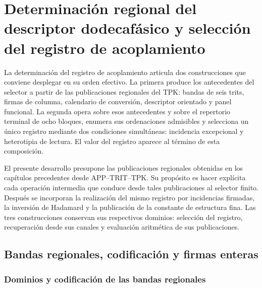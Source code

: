 \section{Determinación regional del descriptor dodecafásico y selección del registro de acoplamiento}
\label{chap:despliegue-selector-k}

La determinación del registro de acoplamiento articula dos construcciones
que conviene desplegar en su orden efectivo. La primera produce los
antecedentes del selector a partir de las publicaciones regionales del TPK:
bandas de seis trits, firmas de columna, calendario de conversión,
descriptor orientado y panel funcional. La segunda opera sobre esos
antecedentes y sobre el repertorio terminal de ocho bloques, enumera sus
ordenaciones admisibles y selecciona un único registro mediante dos
condiciones simultáneas: incidencia excepcional y heterotipia de lectura.
El valor del registro aparece al término de esta composición.

El presente desarrollo presupone las publicaciones regionales obtenidas
en los capítulos precedentes desde APP--TRIT--TPK. Su propósito es hacer
explícita cada operación intermedia que conduce desde tales publicaciones
al selector finito. Después se incorporan la realización del mismo
registro por incidencias firmadas, la inversión de Hadamard y la
publicación de la constante de estructura fina. Las tres construcciones
conservan sus respectivos dominios: selección del registro, recuperación
desde sus canales y evaluación aritmética de sus publicaciones.

\subsection{Bandas regionales, codificación y firmas enteras}

\subsubsection{Dominios y codificación de las bandas regionales}


